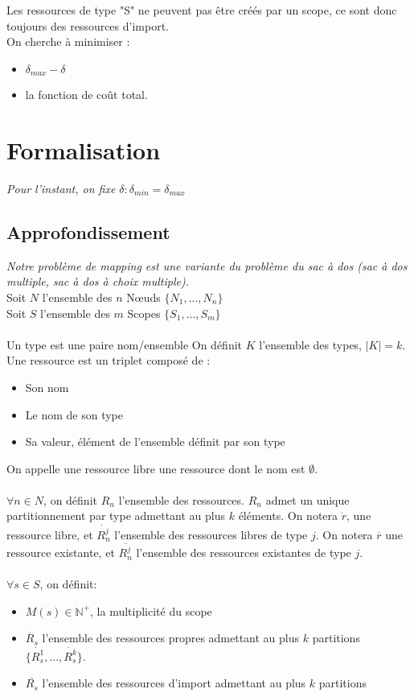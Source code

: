 \documentclass[11pt,a4paper]{article} %
\begin{document}
Les ressources de type "S" ne peuvent pas être créés par un scope, ce sont donc toujours des ressources d'import.\\
On cherche à minimiser : \begin{itemize}
\item $\delta_{max} - \delta$
\item la fonction de coût total.
\end{itemize}

\section{Formalisation}
\textit{Pour l'instant, on fixe $\delta: \delta_{min} = \delta_{max}$}
\subsection{Approfondissement}
\textit{Notre problème de mapping est une variante du problème du sac à dos (sac à dos multiple, sac à dos à choix multiple).}\\
Soit $N$ l'ensemble des $n$ Nœuds $\{N_1,...,N_n\}$\\
Soit $S$ l'ensemble des $m$ Scopes $\{S_1,...,S_m\}$\\\\
Un type est une paire nom/ensemble
On définit $K$ l'ensemble des types, $|K|=k$.\\
Une ressource est un triplet composé de :
\begin{itemize}
\item Son nom
\item Le nom de son type
\item Sa valeur, élément de l'ensemble définit par son type
\end{itemize}
On appelle une ressource libre une ressource dont le nom est $\emptyset$.\\\\
$\forall n \in N$, on définit $R_n$ l'ensemble des ressources. $R_n$ admet un unique partitionnement par type admettant au plus $k$ éléments. On notera $\dot{r}$, une ressource libre, et $\dot{R^j_n}$ l'ensemble des ressources libres de type $j$. On notera $\overline{r}$ une ressource existante, et $\overline{R^j_n}$ l'ensemble des ressources existantes de type $j$.\\\\
$\forall s \in S$, on définit:\begin{itemize}
\item $ M(s) \in \mathbb{N}^+ $, la multiplicité du scope 
\item $\dot{R_s}$ l'ensemble des ressources propres admettant au plus $k$ partitions $\{\dot{R^1_s},...,\dot{R^k_s}\}$.
\item $\overline{R_s}$ l'ensemble des ressources d'import admettant au plus $k$ partitions\\\\
\end{itemize}
\end{document}
